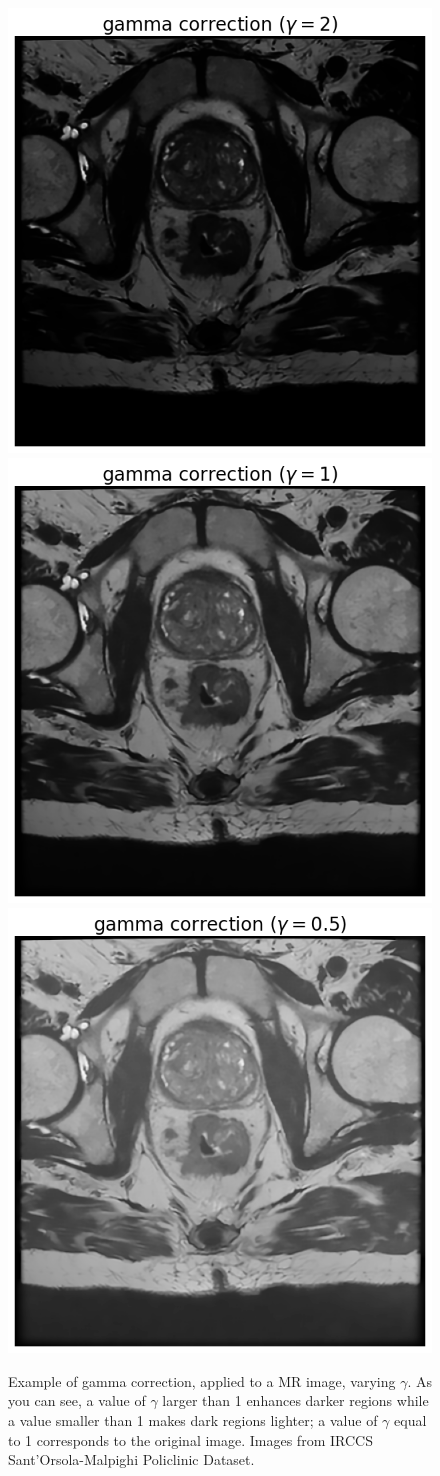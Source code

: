 \documentclass{standalone}
\begin{document}
\begin{figure}[!htp]

    \centering
    \includegraphics[width=.33\textwidth]{../images/gamma_2.png}\hfill
    \includegraphics[width=.33\textwidth]{../images/gamma_1.png}\hfill
    \includegraphics[width=.33\textwidth]{../images/gamma_1.5.png}
    
\caption{Example of gamma correction, applied to a MR image, varying $\gamma$.
As you can see, a value of $\gamma$ larger than 1 enhances darker regions while a value smaller than 1 makes dark regions lighter; a value of $\gamma$ equal to 1 corresponds to the original image.
Images from IRCCS Sant’Orsola-Malpighi Policlinic Dataset.}
    
\end{figure}
\end{document}
